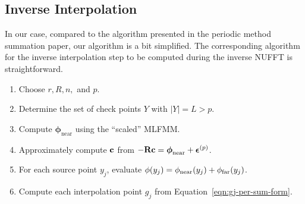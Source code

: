 \subsection*{Inverse Interpolation}

In our case, compared to the algorithm presented in the periodic
method summation paper, our algorithm is a bit simplified. The
corresponding algorithm for the inverse interpolation step to be computed during the inverse NUFFT is straightforward. \\

\begin{enumerate}
\item Choose $r, R, n,$ and $p$.
\item Determine the set of check points $Y$ with $|Y| = L > p$.
\item Compute $\boldsymbol{\phi}_{\operatorname{near}}$ using the ``scaled'' MLFMM.
\item Approximately compute $\bold{c}$ from $- \bold{R} \bold{c} =
  \boldsymbol{\phi}_{\operatorname{near}} + \boldsymbol{\epsilon}^{(p)}$.
\item For each source point $y_j$,
  evaluate $\phi(y_j) = \phi_{\operatorname{near}}(y_j) + \phi_{\operatorname{far}}(y_j)$.
\item Compute each interpolation point $g_j$ from
  Equation~\ref{eqn:gj-per-sum-form}.
\end{enumerate}


